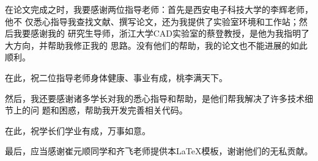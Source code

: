 \begin{thanksfor}

在论文完成之时，我要感谢两位指导老师：首先是西安电子科技大学的李辉老师，他不
仅悉心指导我查找文献、撰写论文，还为我提供了实验室环境和工作站；然后我要感谢我的
研究生导师，浙江大学CAD实验室的蔡登教授，是他为我指明了大方向，并帮助我修正我的
思路。没有他们的帮助，我的论文也不能进展的如此顺利。

在此，祝二位指导老师身体健康、事业有成，桃李满天下。

然后，我还要感谢诸多学长对我的悉心指导和帮助，是他们帮我解决了许多技术细节上的问
题和困惑，帮助我开发完善相关代码。

在此，祝学长们学业有成，万事如意。

最后，应当感谢崔元顺同学和齐飞老师提供本LaTeX模板，谢谢他们的无私贡献。
\end{thanksfor}